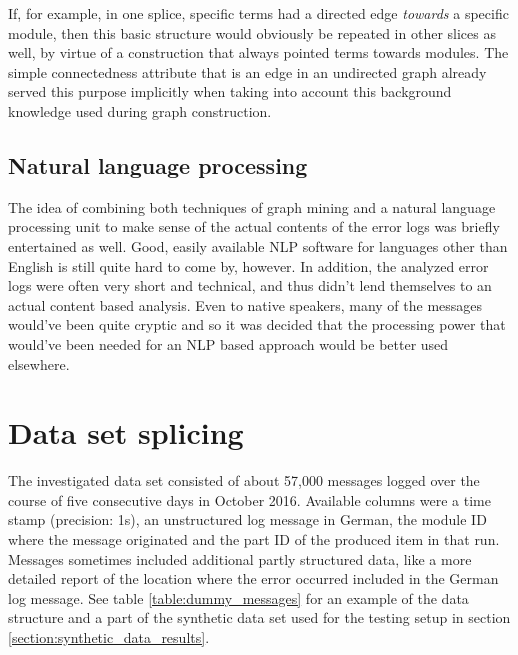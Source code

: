 \documentclass[pdftex,12pt,a4paper]{report}
\begin{document}
If, for example, in one splice, specific terms had a directed edge \textit{towards} a specific module, then this basic structure would obviously be repeated in other slices as well, by virtue of a construction that always pointed terms towards modules. The simple connectedness attribute that is an edge in an undirected graph already served this purpose implicitly when taking into account this background knowledge used during graph construction.

\subsection{Natural language processing}
The idea of combining both techniques of graph mining and a natural language processing unit to make sense of the actual contents of the error logs was briefly entertained as well. Good, easily available NLP software for languages other than English is still quite hard to come by, however. In addition, the analyzed error logs were often very short and technical, and thus didn't lend themselves to an actual content based analysis. Even to native speakers, many of the messages would've been quite cryptic and so it was decided that the processing power that would've been needed for an NLP based approach would be better used elsewhere.

\section{Data set splicing}
\label{section:data_set_splicing}
The investigated data set consisted of about 57,000 messages logged over the course of five consecutive days in October 2016. Available columns were a time stamp (precision: 1s), an unstructured log message in German, the module ID where the message originated and the part ID of the produced item in that run. Messages sometimes included additional partly structured data, like a more detailed report of the location where the error occurred included in the German log message. See table \ref{table:dummy_messages} for an example of the data structure and a part of the synthetic data set used for the testing setup in section \ref{section:synthetic_data_results}.
\end{document}
